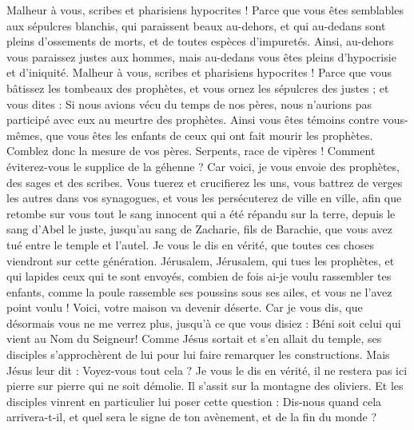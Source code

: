 \begin{multicols}{2}
Malheur à vous, scribes et pharisiens hypocrites ! Parce que vous êtes semblables aux sépulcres blanchis, qui paraissent beaux au-dehors, et qui au-dedans sont pleins d'ossements de morts, et de toutes espèces d’impuretés.
Ainsi, au-dehors vous paraissez justes aux hommes, mais au-dedans vous êtes pleins d'hypocrisie et d'iniquité.
Malheur à vous, scribes et pharisiens hypocrites ! Parce que vous bâtissez les tombeaux des prophètes, et vous ornez les sépulcres des justes ;
et vous dites : Si nous avions vécu du temps de nos pères, nous n'aurions pas participé avec eux au meurtre des prophètes.
Ainsi vous êtes témoins contre vous-mêmes, que vous êtes les enfants de ceux qui ont fait mourir les prophètes.
Comblez donc la mesure de vos pères.
Serpents, race de vipères ! Comment éviterez-vous le supplice de la géhenne ?
Car voici, je vous envoie des prophètes, des sages et des scribes. Vous tuerez et crucifierez les uns, vous battrez de verges les autres dans vos synagogues, et vous les persécuterez de ville en ville,
afin que retombe sur vous tout le sang innocent qui a été répandu sur la terre, depuis le sang d'Abel le juste, jusqu’au sang de Zacharie, fils de Barachie, que vous avez tué entre le temple et l'autel.
Je vous le dis en vérité, que toutes ces choses viendront sur cette génération.
Jérusalem, Jérusalem, qui tues les prophètes, et qui lapides ceux qui te sont envoyés, combien de fois ai-je voulu rassembler tes enfants, comme la poule rassemble ses poussins sous ses ailes, et vous ne l'avez point voulu !
Voici, votre maison va devenir déserte.
Car je vous dis, que désormais vous ne me verrez plus, jusqu'à ce que vous disiez : Béni soit celui qui vient au Nom du Seigneur{}!
\VerseOne{}Comme Jésus sortait et s'en allait du temple, ses disciples s'approchèrent de lui pour lui faire remarquer les constructions.
Mais Jésus leur dit : Voyez-vous tout cela ? Je vous le dis en vérité, il ne restera pas ici pierre sur pierre qui ne soit démolie.
Il s’assit sur la montagne des oliviers. Et les disciples vinrent en particulier lui poser cette question : Dis-nous quand cela arrivera-t-il, et quel sera le signe de ton avènement, et de la fin du monde ?

\end{multicols}
